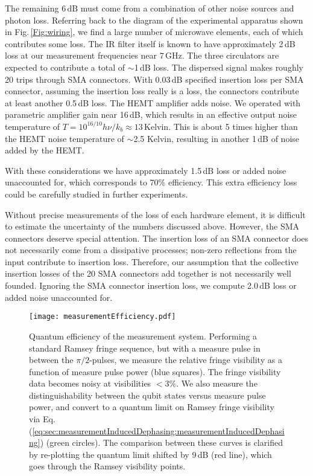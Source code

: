 The remaining $6\,\text{dB}$ must come from a combination of other noise sources and photon loss.
Referring back to the diagram of the experimental apparatus shown in Fig.\,\ref{Fig:wiring}, we find a large number of microwave elements, each of which contributes some loss.
The IR filter itself is known to have approximately 2\,dB loss at our measurement frequencies near $7\,\text{GHz}$.
The three circulators are expected to contribute a total of $\sim$1\,dB loss.
The dispersed signal makes roughly 20 trips through SMA connectors.
With 0.03\,dB specified insertion loss per SMA connector, assuming the insertion loss really is a loss, the connectors contribute at least another 0.5\,dB loss.
The HEMT amplifier adds noise.
We operated with parametric amplifier gain near 16\,dB, which results in an effective output noise temperature of $T = 10^{16/10} h\nu / k_b \approx 13\,\text{Kelvin}$.
This is about 5 times higher than the HEMT noise temperature of $\sim$2.5 Kelvin, resulting in another 1\,dB of noise added by the HEMT.

With these considerations we have approximately 1.5\,dB loss or added noise unaccounted for, which corresponds to 70\% efficiency.
This extra efficiency loss could be carefully studied in further experiments.

Without precise measurements of the loss of each hardware element, it is difficult to estimate the uncertainty of the numbers discussed above.
However, the SMA connectors deserve special attention.
The insertion loss of an SMA connector does not necessarily come from a dissipative processes; non-zero reflections from the input contribute to insertion loss.
Therefore, our assumption that the collective insertion losses of the 20 SMA connectors add together is not necessarily well founded.
Ignoring the SMA connector insertion loss, we compute 2.0\,dB loss or added noise unaccounted for.


\begin{figure}
\begin{centering}
\texttt{[image: measurementEfficiency.pdf]}
\par\end{centering}
\caption{Quantum efficiency of the measurement system. Performing a standard Ramsey fringe sequence, but with a measure pulse in between the $\pi/2$-pulses, we measure the relative fringe visibility as a function of measure pulse power (blue squares). The fringe visibility data becomes noisy at visibilities $<3\%$. We also measure the distinguishability between the qubit states versus measure pulse power, and convert to a quantum limit on Ramsey fringe visibility via Eq.\,(\ref{eq:sec:measurementInducedDephasing:measurementInducedDephasing}) (green circles). The comparison between these curves is clarified by re-plotting the quantum limit shifted by 9\,dB (red line), which goes through the Ramsey visibility points.}
\label{Fig:sec:measurementEfficiency:measurementEfficiency}
\end{figure}
